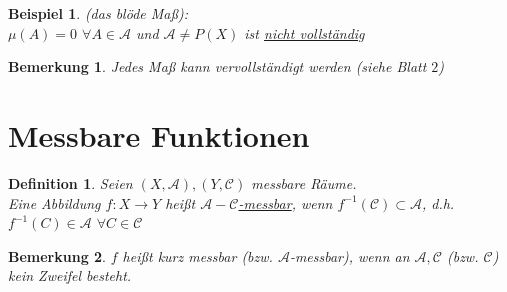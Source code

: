 \documentclass[11pt]{memoir}
\theoremstyle{break}
\newtheorem{Definition}{Definition}[chapter]
\newtheorem{Bemerkung}{Bemerkung}[chapter]
\newtheorem{Beispiel}{Beispiel}[chapter]
\begin{document}
\begin{Beispiel}
(das blöde Maß): \\
$\mu(A) = 0$ $ \forall A \in \mathscr{A}$ und $\mathscr{A} \ne P(X)$ ist \underline{nicht vollständig}
\end{Beispiel}

\begin{Bemerkung}
Jedes Maß kann vervollständigt werden (siehe Blatt $2$) 
\end{Bemerkung}


\section{Messbare Funktionen}

\begin{Definition}
Seien $(X, \mathscr{A}), (Y, \mathscr{C})$ messbare Räume.\\
 Eine Abbildung $f: X \rightarrow Y$ heißt \underline{$\mathscr{A}-\mathscr{C}$-messbar}, wenn $f^{-1}(\mathscr{C}) \subset \mathscr{A}$, d.h. $f^{-1}(C) \in \mathscr{A}$ $ \forall C \in \mathscr{C}$
\end{Definition}

\begin{Bemerkung}
$f$ heißt kurz messbar (bzw. $\mathscr{A}$-messbar), wenn an $\mathscr{A}, \mathscr{C}$ (bzw. $\mathscr{C}$) kein Zweifel besteht.
\end{Bemerkung}
\end{document}
